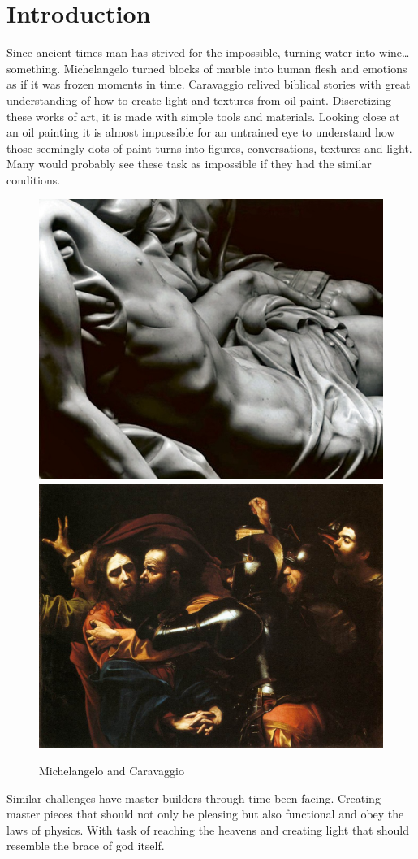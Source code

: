 \chapter{Introduction}

Since ancient times man has strived for the impossible, turning water into wine…something. 
Michelangelo turned blocks of marble into human flesh and emotions as if it was frozen moments in time. Caravaggio relived biblical stories with great understanding of how to create light and textures from oil paint. Discretizing these works of art, it is made with simple tools and materials. Looking close at an oil painting it is almost impossible for an untrained eye to understand how those seemingly dots of paint turns into figures, conversations, textures and light. Many would probably see these task as impossible if they had the similar conditions.

\begin{figure}[H]
\centering
\includegraphics[height=0.39\linewidth ]{figure/Introduction/Mich.jpg}
\includegraphics[height=0.39\linewidth ]{figure/Introduction/Caravaggio.jpg}
\caption{Michelangelo and Caravaggio}
\end{figure}

Similar challenges have master builders through time been facing. Creating master pieces that should not only be pleasing but also functional and obey the laws of physics. With task of reaching the heavens and creating light that should resemble the brace of god itself. 

